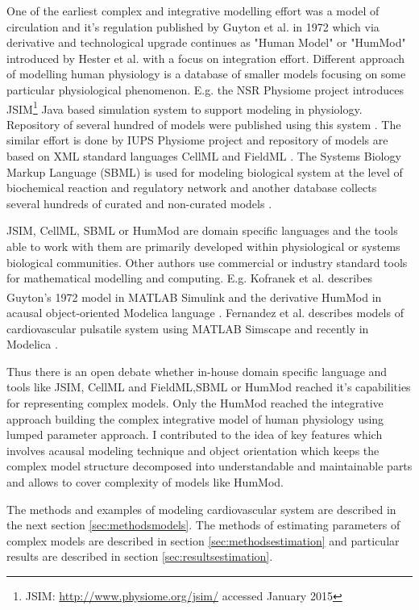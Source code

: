 One of the earliest complex and integrative modelling effort was a model of circulation and it's regulation published by Guyton et al. in 1972 \cite{Guyton1972} which via derivative and technological upgrade continues as "Human Model" or "HumMod" introduced by Hester et al. \cite{Hester2011systems,hester2011} with a focus on integration effort. Different approach of modelling human physiology is a database of smaller models focusing on some particular physiological phenomenon. E.g. the NSR Physiome project introduces  JSIM\footnote{JSIM: \url{http://www.physiome.org/jsim/} accessed January 2015} Java based simulation system to support modeling in  physiology. Repository of several hundred of models were published using this system \cite{Butterworth2014}. The similar effort is done by IUPS Physiome project and repository of models are  based on XML standard languages CellML and FieldML \cite{Hunter2004,Yu2011}. The Systems Biology Markup Language (SBML) is used for modeling biological system at the level of biochemical reaction and regulatory network and another database collects several hundreds of curated and non-curated models \cite{Hucka2004,LeNovere2006}.

JSIM, CellML, SBML or HumMod are domain specific languages and the tools able to work with them are primarily developed within physiological or systems biological communities. Other authors use commercial or industry standard tools for mathematical modelling and computing. E.g. Kofranek et al. describes Guyton's 1972 model in MATLAB\textsuperscript{\textregistered} Simulink \cite{Kofranek2010} and the derivative HumMod in acausal object-oriented Modelica language \cite{Kofranek2011hummod,kofranek2013hummod}. Fernandez et al. describes models of cardiovascular pulsatile system using MATLAB Simscape  \cite{FernandezDeCanete2013} and recently in Modelica  \cite{FernandezdeCanete2014}.

Thus there is an open debate whether in-house domain specific language and tools like JSIM, CellML and FieldML,SBML or HumMod reached it's capabilities for representing complex models. Only the HumMod reached the integrative approach building the complex integrative model of human physiology using lumped parameter approach. I contributed to the idea of key features which involves acausal modeling technique and object orientation which keeps the complex model structure decomposed into understandable and maintainable parts and allows to cover complexity of models like HumMod. 

The methods and examples of modeling cardiovascular system are described in the next section \ref{sec:methodsmodels}. The methods of estimating parameters of complex models are described in section \ref{sec:methodsestimation} and particular results are described in section \ref{sec:resultsestimation}.

